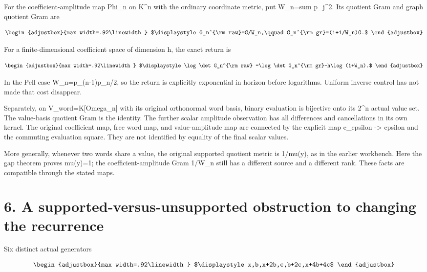 For the coefficient-amplitude map Phi\_n on K\^{}n with the ordinary coordinate metric, put W\_n=sum p\_j\^{}2. Its quotient Gram and graph quotient Gram are

\[
\begin{adjustbox}{max width=.92\linewidth}
$\displaystyle G_n^{\rm raw}=G/W_n,\qquad
G_n^{\rm gr}=(1+1/W_n)G.$
\end{adjustbox}
\]

For a finite-dimensional coefficient space of dimension h, the exact return is

\[
\begin{adjustbox}{max width=.92\linewidth}
$\displaystyle \log\det G_n^{\rm raw}
=\log\det G_n^{\rm gr}-h\log(1+W_n).$
\end{adjustbox}
\]

In the Pell case W\_n=p\_(n-1)p\_n/2, so the return is explicitly exponential in horizon before logarithms. Uniform inverse control has not made that cost disappear.

Separately, on V\_word=K{[}Omega\_n{]} with its original orthonormal word basis, binary evaluation is bijective onto its 2\^{}n actual value set. The value-basis quotient Gram is the identity. The further scalar amplitude observation has all differences and cancellations in its own kernel. The original coefficient map, free word map, and value-amplitude map are connected by the explicit map e\_epsilon -\textgreater{} epsilon and the commuting evaluation square. They are not identified by equality of the final scalar values.

More generally, whenever two words share a value, the original supported quotient metric is 1/mu(y), as in the earlier workbench. Here the gap theorem proves mu(y)=1; the coefficient-amplitude Gram 1/W\_n still has a different source and a different rank. These facts are compatible through the stated maps.

\section{6. A supported-versus-unsupported obstruction to changing the recurrence}\label{n15-a-supported-versus-unsupported-obstruction-to-changing-the-recurrence}

Six distinct actual generators

\[
\begin{adjustbox}{max width=.92\linewidth}
$\displaystyle x,b,x+2b,c,b+2c,x+4b+4c$
\end{adjustbox}
\]

